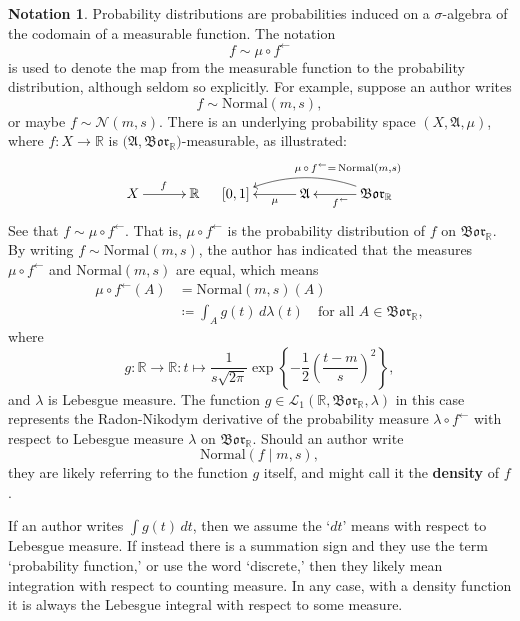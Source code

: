 \documentclass[
twoside=true,
paper=letter,
fontsize=11pt,
pagesize=auto,
leqno,
openany,
headsepline,
overfullrule,
]{scrbook}
\theoremstyle{plain}
\theoremstyle{plain}
\theoremstyle{definition}
\newtheorem{notn}[thm]{Notation}
\theoremstyle{bfnoteitalic}
\theoremstyle{bfnoteroman}
\newcommand{\term}[1]{\textbf{#1}\index{#1}}
\newcommand{\sigalg}[1]{\mathfrak{#1}}
\newcommand{\cali}[1]{\mathscr{#1}}
\newcommand{\definedby}{\coloneqq}
\newcommand{\borel}{\mathfrak{Bor}}
\newcommand{\textsigma}{\hbox{\large{$\sigma$}}\kern-1pt}
\newcommand{\preimage}[1]{#1^{\leftarrow}}
\newcommand{\R}{\mathbb{R}}
\newcommand{\sigmaalgebra}{\sigalg{A}}
\newcommand{\funcf}{f}
\newcommand{\funcg}{g}
\newcommand{\function}{f}
\newcommand{\functionii}{g}
\newcommand{\measurespace}{X}
\newcommand{\measure}{\mu}
\newcommand{\measmu}{\mu}
\newcommand{\measlambda}{\lambda}
\newcommand{\seti}{A}
\begin{document}
\begin{notn}
Probability distributions are probabilities induced on a \textsigma-algebra of the codomain of a measurable function. The notation
\[
\function \sim \measure\circ\preimage{\function}
\]
is used to denote the map from the measurable function to the probability distribution, although seldom so explicitly.
For example, suppose an author writes 
\[
\function\sim \text{Normal}(m,s),
\]
or maybe $\function\sim \cali{N}(m,s)$.
There is an underlying probability space
$(\measurespace,\sigmaalgebra,\measmu)$, where 
$\funcf:\measurespace\to\R$
is  
$\bigl(\sigmaalgebra,\borel_\R \bigr)$\hyp{}measurable,
as illustrated:
\[
\xymatrix@R=18pt@C=30pt{\measurespace \ar[r]^\funcf & \R \\}
\quad
\xymatrix@R=18pt@C=30pt{
[0,1]
& \sigmaalgebra 
\ar[l]^-\measmu
& \borel_\R
\ar[l]^{\preimage{\funcf}} 
\ar@/_12pt/[ll]_{\measmu\,\circ\,
\funcf
\makebox[0pt][l]{$\scriptstyle{^\leftarrow =\, \text{Normal}(m,s)}$}}
}
\]
%
%
%
See that
$\function\sim \measmu\circ \preimage{\function}$.
That is, $\measmu\circ \preimage{\function}$ is the probability distribution of $\function$ on 
$\borel_\R$.
By writing $\function\sim \text{Normal}(m,s)$, the author has indicated that the measures 
$\measmu\circ \preimage{\function}$ and
$\text{Normal}(m,s)$ are equal,
which means
\begin{align*}
\measmu\circ \preimage{\function}(\seti) 
&= \text{Normal}(m,s)(\seti) \\
&\definedby\int_\seti \functionii(t)\,d\lambda(t)\quad\text{for all $\seti\in\borel_\R$},
\end{align*}
where 
\[
\functionii :\R\to\R:
t\mapsto
\frac{1}{s\sqrt{2\pi}}
\exp
\left\{
-\frac{1}{2}
\left(
\frac{t-m}{s}
\right)^2
\right\},
\]
and $\measlambda$ is Lebesgue measure.
The function 
$\functionii \in\cali{L}_1(\R,\borel_\R,\lambda)$
in this case represents the Radon-Nikodym derivative of the probability measure
$\measlambda \circ \preimage{\function}$ 
with respect to Lebesgue measure $\lambda$ on $\borel_\R$.
Should an author write 
\[\text{Normal}(\function\mid m,s),\] they are likely referring to the function $\functionii$ itself, and might call it the \term{density} of $\function$. 

If an author  writes $\int \funcg(t)\,dt$, then we assume the `$dt$' means with respect to Lebesgue measure. If instead there is a summation sign and they use the term `probability function,' or use the word `discrete,' then they likely mean integration with respect to counting measure.  In any case, with a density function it is always the Lebesgue integral with respect to some measure.
\end{notn}
\end{document}
